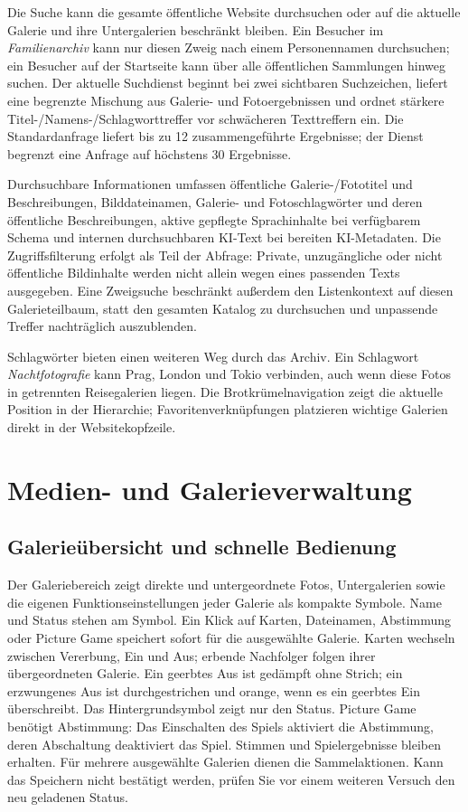 \documentclass[11pt,a4paper]{article}
\begin{document}
Die Suche kann die gesamte öffentliche Website durchsuchen oder auf die aktuelle
Galerie und ihre Untergalerien beschränkt bleiben. Ein Besucher im
\emph{Familienarchiv} kann nur diesen Zweig nach einem Personennamen
durchsuchen; ein Besucher auf der Startseite kann über alle öffentlichen
Sammlungen hinweg suchen. Der aktuelle Suchdienst beginnt bei zwei sichtbaren
Suchzeichen, liefert eine begrenzte Mischung aus Galerie- und Fotoergebnissen
und ordnet stärkere Titel-/Namens-/Schlagworttreffer vor schwächeren
Texttreffern ein. Die Standardanfrage liefert bis zu 12 zusammengeführte
Ergebnisse; der Dienst begrenzt eine Anfrage auf höchstens 30 Ergebnisse.

Durchsuchbare Informationen umfassen öffentliche Galerie-/Fototitel und
Beschreibungen, Bilddateinamen, Galerie- und Fotoschlagwörter und deren
öffentliche Beschreibungen, aktive gepflegte Sprachinhalte bei verfügbarem
Schema und internen durchsuchbaren KI-Text bei bereiten KI-Metadaten. Die
Zugriffsfilterung erfolgt als Teil der Abfrage: Private, unzugängliche oder
nicht öffentliche Bildinhalte werden nicht allein wegen eines passenden Texts
ausgegeben. Eine Zweigsuche beschränkt außerdem den Listenkontext auf diesen
Galerieteilbaum, statt den gesamten Katalog zu durchsuchen und unpassende
Treffer nachträglich auszublenden.

Schlagwörter bieten einen weiteren Weg durch das Archiv. Ein Schlagwort
\emph{Nachtfotografie} kann Prag, London und Tokio verbinden, auch wenn diese
Fotos in getrennten Reisegalerien liegen. Die Brotkrümelnavigation zeigt die
aktuelle Position in der Hierarchie; Favoritenverknüpfungen platzieren wichtige
Galerien direkt in der Websitekopfzeile.
\section{Medien- und Galerieverwaltung}
\label{sec:admin}

\subsection{Galerieübersicht und schnelle Bedienung}
Der Galeriebereich zeigt direkte und untergeordnete Fotos, Untergalerien sowie
die eigenen Funktionseinstellungen jeder Galerie als kompakte Symbole. Name und
Status stehen am Symbol. Ein Klick auf Karten, Dateinamen, Abstimmung oder
Picture Game speichert sofort für die ausgewählte Galerie. Karten wechseln
zwischen Vererbung, Ein und Aus; erbende Nachfolger folgen ihrer übergeordneten
Galerie. Ein geerbtes Aus ist gedämpft ohne Strich; ein erzwungenes Aus ist
durchgestrichen und orange, wenn es ein geerbtes Ein überschreibt. Das
Hintergrundsymbol zeigt nur den Status. Picture Game benötigt
Abstimmung: Das Einschalten des Spiels aktiviert die Abstimmung, deren
Abschaltung deaktiviert das Spiel. Stimmen und Spielergebnisse bleiben erhalten.
Für mehrere ausgewählte Galerien dienen die Sammelaktionen. Kann das Speichern
nicht bestätigt werden, prüfen Sie vor einem weiteren Versuch den neu geladenen
Status.
\end{document}
